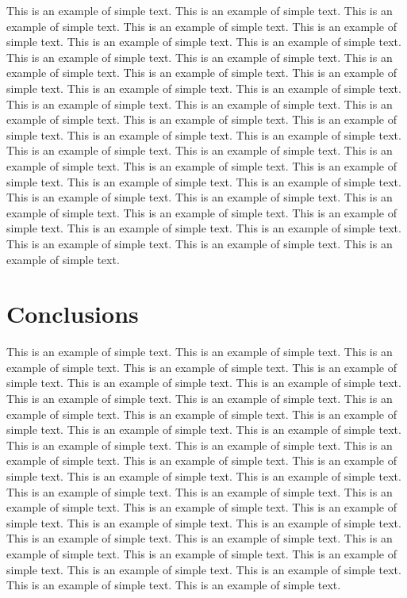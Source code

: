 \documentclass[11pt]{now}
\begin{document}
This is an example of simple text. This is an
example of simple text.  This is an example of simple text. This is
an example of simple text.  This is an example of simple text. This
is an example of simple text.  This is an example of simple text.
This is an example of simple text.  This is an example of simple
text. This is an example of simple text.  This is an example of
simple text. This is an example of simple text.  This is an example
of simple text. This is an example of simple text.  This is an
example of simple text. This is an example of simple text.  This is
an example of simple text. This is an example of simple text.  This
is an example of simple text. This is an example of simple text.
This is an example of simple text. This is an example of simple text.
This is an example of simple text. This is an example of simple text.
This is an example of simple text. This is an example of simple text.
This is an example of simple text. This is an example of simple text.
This is an example of simple text. This is an example of simple text.
This is an example of simple text. This is an example of simple text.
This is an example of simple text. This is an example of simple text.
This is an example of simple text. This is an example of simple text.
This is an example of simple text. This is an example of simple text.

\chapter*{Conclusions}
%

This is an example of simple text. This is an
example of simple text.  This is an example of simple text. This is
an example of simple text.  This is an example of simple text. This
is an example of simple text.  This is an example of simple text.
This is an example of simple text.  This is an example of simple
text. This is an example of simple text.  This is an example of
simple text. This is an example of simple text.  This is an example
of simple text. This is an example of simple text.  This is an
example of simple text. This is an example of simple text.  This is
an example of simple text. This is an example of simple text.  This
is an example of simple text. This is an example of simple text.
This is an example of simple text. This is an example of simple text.
This is an example of simple text. This is an example of simple text.
This is an example of simple text. This is an example of simple text.
This is an example of simple text. This is an example of simple text.
This is an example of simple text. This is an example of simple text.
This is an example of simple text. This is an example of simple text.
This is an example of simple text. This is an example of simple text.
This is an example of simple text. This is an example of simple text.
This is an example of simple text.
\end{document}
